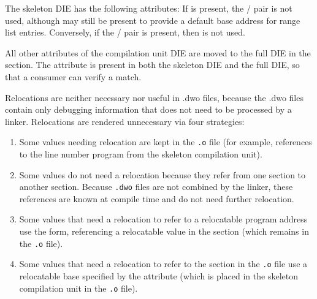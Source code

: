 The skeleton \DWTAGcompileunit{} DIE has the following attributes:
\dag{} If \DWATranges{} is present, the \DWATlowpc{}/\DWAThighpc{}
pair is not used, although \DWATlowpc{} may still be present
to provide a default base address for range list entries.
Conversely, if the \DWATlowpc/\linebreak[0]\DWAThighpc{} pair is
present, then \DWATranges{} is not used.

All other attributes of the compilation unit DIE are moved to
the full DIE in the \dotdebuginfodwo{} section.
The \DWATdwoid{} attribute is present
in both the skeleton DIE and the full DIE, so that a consumer
can verify a match.


Relocations are neither necessary nor useful in .dwo files, because the
.dwo files contain only debugging information that does not need to be
processed by a linker. Relocations are rendered unnecessary via
four strategies:

\begin{enumerate}[1. ]
\item Some values needing relocation are kept in the \texttt{.o} file
(for example, references to the line number program from the skeleton
compilation unit).

\item Some values do not need a relocation because they refer from
one \dotdwo{} section to another \dotdwo{} section. Because \texttt{.dwo} files are not
combined by the linker, these references are known at compile time and
do not need further relocation.

\item Some values that need a relocation to refer to a
relocatable program address use the \DWFORMaddrx{} form,
referencing a relocatable value in the \dotdebugaddr{} section (which
remains in the \texttt{.o} file).

\item Some values that need a relocation to refer to the
\dotdebugranges{} section in the \texttt{.o} file use a relocatable base
specified by the \DWATrangesbase{} attribute (which is placed in the
skeleton compilation unit in the \texttt{.o} file).

\end{enumerate}


